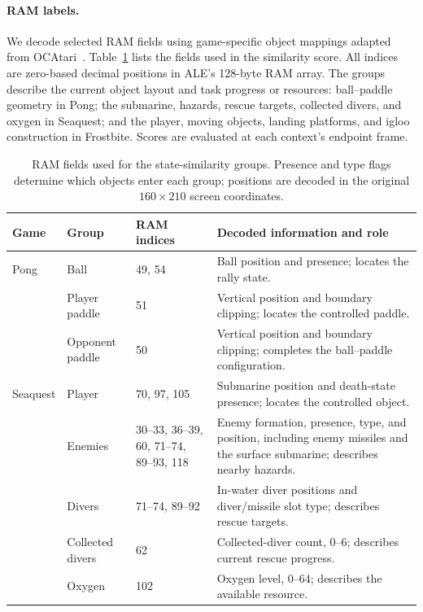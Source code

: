 \documentclass{article} %
\begin{document}
\paragraph{RAM labels.}
We decode selected RAM fields using game-specific object mappings adapted from OCAtari~\citep{delfosse2023ocatari}. Table~\ref{tab:ram_retrieval_fields} lists the fields used in the similarity score. All indices are zero-based decimal positions in ALE's 128-byte RAM array. The groups describe the current object layout and task progress or resources: ball--paddle geometry in Pong; the submarine, hazards, rescue targets, collected divers, and oxygen in Seaquest; and the player, moving objects, landing platforms, and igloo construction in Frostbite. Scores are evaluated at each context's endpoint frame.

\begin{table}[!htbp]
\centering
\footnotesize
\setlength{\tabcolsep}{3pt}
\renewcommand{\arraystretch}{1.15}
\caption{RAM fields used for the state-similarity groups. Presence and type flags determine which objects enter each group; positions are decoded in the original $160\times210$ screen coordinates.}
\label{tab:ram_retrieval_fields}
\begin{tabular}{@{}p{}p{}p{}p{}@{}}
\toprule
Game & Group & RAM indices & Decoded information and role \\
\midrule
Pong & Ball & 49, 54 & Ball position and presence; locates the rally state. \\
 & Player paddle & 51 & Vertical position and boundary clipping; locates the controlled paddle. \\
 & Opponent paddle & 50 & Vertical position and boundary clipping; completes the ball--paddle configuration. \\
\midrule
Seaquest & Player & 70, 97, 105 & Submarine position and death-state presence; locates the controlled object. \\
 & Enemies & 30--33, 36--39, 60, 71--74, 89--93, 118 & Enemy formation, presence, type, and position, including enemy missiles and the surface submarine; describes nearby hazards. \\
 & Divers & 71--74, 89--92 & In-water diver positions and diver/missile slot type; describes rescue targets. \\
 & Collected divers & 62 & Collected-diver count, 0--6; describes current rescue progress. \\
 & Oxygen & 102 & Oxygen level, 0--64; describes the available resource. \\

\end{tabular}
\end{table}
\end{document}
